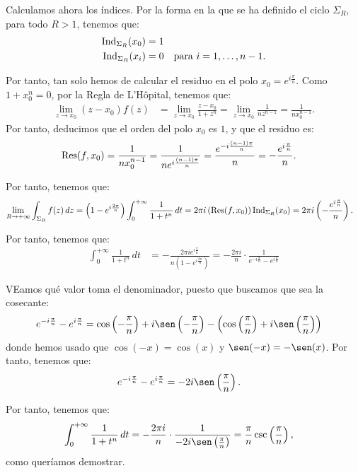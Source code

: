 \begin{ejercicio}
    Calculamos ahora los índices. Por la forma en la que se ha definido el ciclo $\Sigma_R$, para todo $R > 1$, tenemos que:
    \begin{align*}
        \operatorname{Ind}_{\Sigma_R}(x_0) &= 1\\
        \operatorname{Ind}_{\Sigma_R}(x_i) &= 0 \quad \text{para } i=1, \ldots, n-1.
    \end{align*}

    Por tanto, tan solo hemos de calcular el residuo en el polo $x_0 = e^{i\frac{\pi}{n}}$. Como $1+x_0^n = 0$, por la Regla de L'Hôpital, tenemos que:
    \begin{align*}
        \lim_{z\to x_0} (z - x_0)f(z) &= \lim_{z\to x_0} \frac{z - x_0}{1 + z^n}
        = \lim_{z\to x_0} \frac{1}{n z^{n-1}} = \frac{1}{n x_0^{n-1}}.
    \end{align*}
    Por tanto, deducimos que el orden del polo $x_0$ es $1$, y que el residuo es:
    \begin{align*}
        \operatorname{Res}(f, x_0) &= \frac{1}{n x_0^{n-1}} = \frac{1}{n e^{i\frac{(n-1)\pi}{n}}} = \frac{e^{-i\frac{(n-1)\pi}{n}}}{n}
        = -\frac{e^{i\frac{\pi}{n}}}{n}.
    \end{align*}

    Por tanto, tenemos que:
    \begin{align*}
        \lim_{R\to+\infty} \int_{\Sigma_R} f(z) \, dz &= \left(1 - e^{i\frac{2\pi}{n}}\right)\int_{0}^{+\infty} \frac{1}{1 + t^n} \, dt
        = 2\pi i\left(\operatorname{Res}(f, x_0)\right)\operatorname{Ind}_{\Sigma_R}(x_0)
        = 2\pi i\left(-\frac{e^{i\frac{\pi}{n}}}{n}\right).
    \end{align*}

    Por tanto, tenemos que:
    \begin{align*}
        \int_{0}^{+\infty} \frac{1}{1 + t^n} \, dt &= -\frac{2\pi i e^{i\frac{\pi}{n}}}{n\left(1 - e^{i\frac{2\pi}{n}}\right)}
        = -\frac{2\pi i}{n} \cdot \frac{1}{e^{-i\frac{\pi}{n}} - e^{i\frac{\pi}{n}}}
    \end{align*}

    VEamos qué valor toma el denominador, puesto que buscamos que sea la cosecante:
    \begin{align*}
        e^{-i\frac{\pi}{n}} - e^{i\frac{\pi}{n}} &= \cos\left(-\frac{\pi}{n}\right) + i\sen\left(-\frac{\pi}{n}\right) - \left(\cos\left(\frac{\pi}{n}\right) + i\sen\left(\frac{\pi}{n}\right)\right)
    \end{align*}
    donde hemos usado que $\cos(-x) = \cos(x)$ y $\sen(-x) = -\sen(x)$. Por tanto, tenemos que:
    \begin{align*}
        e^{-i\frac{\pi}{n}} - e^{i\frac{\pi}{n}} &= -2i\sen\left(\frac{\pi}{n}\right).
    \end{align*}

    Por tanto, tenemos que:
    \begin{align*}
        \int_{0}^{+\infty} \frac{1}{1 + t^n} \, dt &= -\frac{2\pi i}{n} \cdot \frac{1}{-2i\sen\left(\frac{\pi}{n}\right)}
        = \frac{\pi}{n}\csc\left(\frac{\pi}{n}\right),
    \end{align*}
    como queríamos demostrar.
\end{ejercicio}

